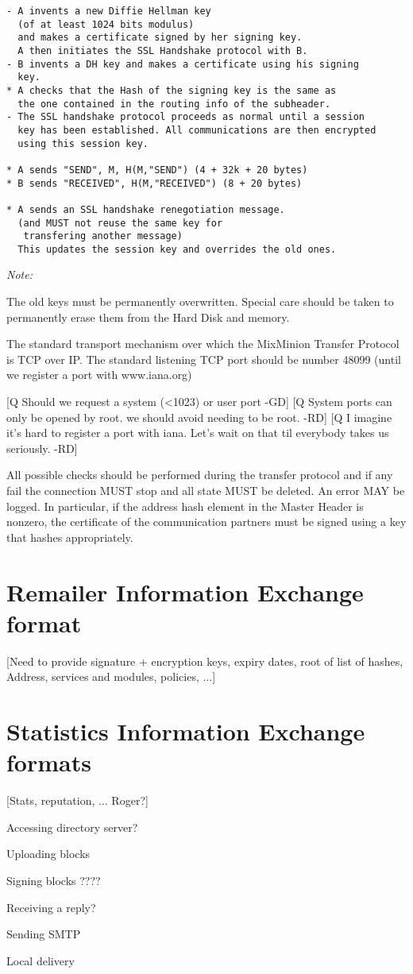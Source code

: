 \begin{verbatim}
- A invents a new Diffie Hellman key 
  (of at least 1024 bits modulus)
  and makes a certificate signed by her signing key.
  A then initiates the SSL Handshake protocol with B.
- B invents a DH key and makes a certificate using his signing
  key.
* A checks that the Hash of the signing key is the same as
  the one contained in the routing info of the subheader.
- The SSL handshake protocol proceeds as normal until a session
  key has been established. All communications are then encrypted
  using this session key.

* A sends "SEND", M, H(M,"SEND") (4 + 32k + 20 bytes)
* B sends "RECEIVED", H(M,"RECEIVED") (8 + 20 bytes)

* A sends an SSL handshake renegotiation message.
  (and MUST not reuse the same key for 
   transfering another message)
  This updates the session key and overrides the old ones.
\end{verbatim}

\emph{Note:}

The old keys must be permanently overwritten. Special care should be
taken to permanently erase them from the Hard Disk and memory. 

The standard transport mechanism over which the MixMinion Transfer
Protocol is TCP over IP. The standard listening TCP port should be 
number 48099 (until we register a port with www.iana.org)

[Q Should we request a system (<1023) or user port -GD]
[Q System ports can only be opened by root. we should avoid needing
to be root. -RD]
[Q I imagine it's hard to register a port with iana. Let's wait on
that til everybody takes us seriously. -RD]

All possible checks should be performed during the transfer protocol
and if any fail the connection MUST stop and all state MUST
be deleted. An error MAY be logged. In particular, if the address
hash element in the Master Header is nonzero, the certificate of
the communication partners must be signed using a key that hashes
appropriately.

\section{Remailer Information Exchange format}

[Need to provide signature + encryption keys, expiry dates, root of
list of hashes, Address, services and modules, policies, ...]

\section{Statistics Information Exchange formats}

[Stats, reputation, ... Roger?]

Accessing directory server?

Uploading blocks

Signing blocks ????

Receiving a reply?

Sending SMTP

Local delivery

